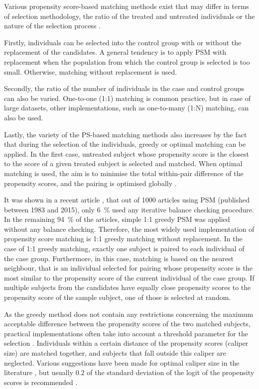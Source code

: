 Various propensity score-based matching methods exist that may differ in terms of selection methodology, the ratio of the treated and untreated individuals or the nature of the selection process \cite{dehejia2002propensity, rubin2006matched, lee2011weight, lee2013propensity, austin2014comparison}.

Firstly, individuals can be selected into the control group with or without the replacement of the candidates. A general tendency is to apply PSM with replacement when the population from which the control group is selected is too small. Otherwise, matching without replacement is used.

Secondly, the ratio of the number of individuals in the case and control groups can also be varied. One-to-one (1:1) matching is common practice, but in case of large datasets, other implementations, such as one-to-many (1:N) matching, can also be used.

Lastly, the variety of the PS-based matching methods also increases by the fact that during the selection of the individuals, greedy or optimal matching can be applied. In the first case, untreated subject whose propensity score is the closest to the score of a given treated subject is selected and matched. When optimal matching is used, the aim is to minimise the total within-pair difference of the propensity scores, and the pairing is optimised globally \cite{rosenbaum2002overt, rosenbaum2010design}.

It was shown in a recent article \cite{king2019propensity}, that out of 1000 articles using PSM (published between 1983 and 2015), only \SI{6}{\percent} used any iterative balance checking procedure. In the remaining \SI{94}{\percent} of the articles, simple 1:1 greedy PSM was applied without any balance checking. Therefore, the most widely used implementation of propensity score matching is 1:1 greedy matching without replacement. In the case of 1:1 greedy matching, exactly one subject is paired to each individual of the case group. Furthermore, in this case, matching is based on the nearest neighbour, that is an individual selected for pairing whose propensity score is the most similar to the propensity score of the current individual of the case group. If multiple subjects from the candidates have equally close propensity scores to the propensity score of the sample subject, one of those is selected at random.

As the greedy method does not contain any restrictions concerning the maximum acceptable difference between the propensity scores of the two matched subjects, practical implementations often take into account a threshold parameter for the selection \cite{austin2011optimal}. Individuals within a certain distance of the propensity scores (caliper size) are matched together, and subjects that fall outside this caliper are neglected. Various suggestions have been made for optimal caliper size in the literature \cite{austin2011optimal, wang2013optimal, lee2016matching}, but usually $0.2$ of the standard deviation of the logit of the propensity scores is recommended \cite{austin2011optimal}.

